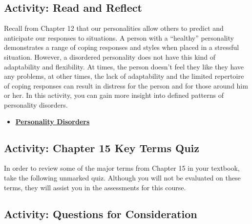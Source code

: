 \documentclass[
]{book}
\providecommand{\tightlist}{%
  \setlength{\itemsep}{0pt}\setlength{\parskip}{0pt}}
\begin{document}
\hypertarget{activity-read-and-reflect-19}{%
\subsection*{Activity: Read and Reflect}\label{activity-read-and-reflect-19}}

\begin{reflect}
Recall from Chapter 12 that our personalities allow others to predict and anticipate our responses to situations. A person with a ``healthy'' personality demonstrates a range of coping responses and styles when placed in a stressful situation. However, a disordered personality does not have this kind of adaptability and flexibility. At times, the person doesn't feel they like they have any problems, at other times, the lack of adaptability and the limited repertoire of coping responses can result in distress for the person and for those around him or her. In this activity, you can gain more insight into defined patterns of personality disorders.

\begin{itemize}
\tightlist
\item
  \href{https://www.camh.ca/en/health-info/mental-illness-and-addiction-index/personality-disorders}{\textbf{Personality Disorders}}
\end{itemize}
\end{reflect}

\hypertarget{activity-chapter-15-key-terms-quiz}{%
\subsection*{Activity: Chapter 15 Key Terms Quiz}\label{activity-chapter-15-key-terms-quiz}}

\begin{reflect}
In order to review some of the major terms from Chapter 15 in your textbook, take the following unmarked quiz. Although you will not be evaluated on these terms, they will assist you in the assessments for this course.
\end{reflect}

\hypertarget{activity-questions-for-consideration-19}{%
\subsection*{Activity: Questions for Consideration}\label{activity-questions-for-consideration-19}}
\end{document}
